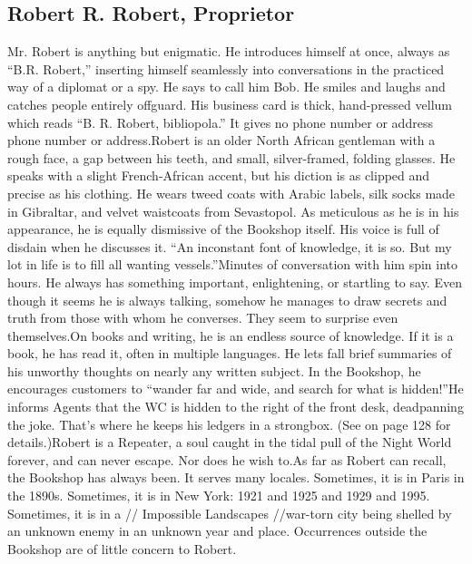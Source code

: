 \documentclass{report}
\begin{document}
\begin{multicols}{2}
\subsection{Robert R. Robert, Proprietor}
Mr. Robert is anything but enigmatic. He introduces himself at once, always as “B.R. Robert,” inserting himself seamlessly into conversations in the practiced way of a diplomat or a spy. He says to call him Bob. He smiles and laughs and catches people entirely offguard. His business card is thick, hand-pressed vellum which reads “B. R. Robert, bibliopola.” It gives no phone number or address phone number or address.Robert is an older North African gentleman with a rough face, a gap between his teeth, and small, silver-framed, folding glasses. He speaks with a slight French-African accent, but his diction is as clipped and precise as his clothing. He wears tweed coats with Arabic labels, silk socks made in Gibraltar, and velvet waistcoats from Sevastopol. As meticulous as he is in his appearance, he is equally dismissive of the Bookshop itself. His voice is full of disdain when he discusses it. “An inconstant font of knowledge, it is so. But my lot in life is to fill all wanting vessels.”Minutes of conversation with him spin into hours. He always has something important, enlightening, or startling to say. Even though it seems he is always talking, somehow he manages to draw secrets and truth from those with whom he converses. They seem to surprise even themselves.On books and writing, he is an endless source of knowledge. If it is a book, he has read it, often in multiple languages. He lets fall brief summaries of his unworthy thoughts on nearly any written subject. In the Bookshop, he encourages customers to “wander far and wide, and search for what is hidden!”He informs Agents that the WC is hidden to the right of the front desk, deadpanning the joke. That's where he keeps his ledgers in a strongbox. (See  on page 128 for details.)Robert is a Repeater, a soul caught in the tidal pull of the Night World forever, and can never escape. Nor does he wish to.As far as Robert can recall, the Bookshop has always been. It serves many locales. Sometimes, it is in Paris in the 1890s. Sometimes, it is in New York: 1921 and 1925 and 1929 and 1995. Sometimes, it is in a \newpage
// Impossible Landscapes //war-torn city being shelled by an unknown enemy in an unknown year and place. Occurrences outside the Bookshop are of little concern to Robert.

\end{multicols}
\end{document}
